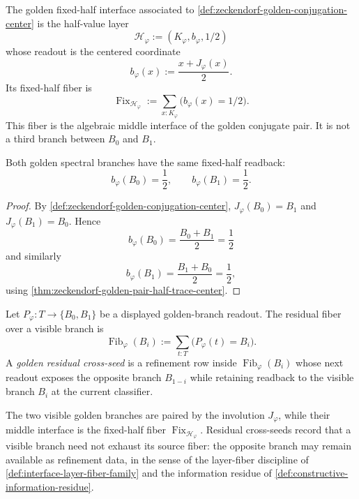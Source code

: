 \begin{definition}
\label{def:zeckendorf-golden-fixed-half-interface}
The golden fixed-half interface associated to
\autoref{def:zeckendorf-golden-conjugation-center} is the half-value
layer
$$
\mathcal H_{\varphi}
:=
(K_{\varphi},b_{\varphi},1/2)
$$
whose readout is the centered coordinate
$$
b_{\varphi}(x):=\frac{x+J_{\varphi}(x)}{2}.
$$
Its fixed-half fiber is
$$
\operatorname{Fix}_{\mathcal H_{\varphi}}
:=
\sum_{x:K_{\varphi}}\bigl(b_{\varphi}(x)=1/2\bigr).
$$
This fiber is the algebraic middle interface of the golden conjugate
pair. It is not a third branch between $B_0$ and $B_1$.
\end{definition}

\begin{theorem}
\label{thm:zeckendorf-golden-branches-read-back-fixed-half}
Both golden spectral branches have the same fixed-half readback:
$$
b_{\varphi}(B_0)=\frac12,
\qquad
b_{\varphi}(B_1)=\frac12.
$$
\end{theorem}

\begin{proof}
By \autoref{def:zeckendorf-golden-conjugation-center},
$J_{\varphi}(B_0)=B_1$ and $J_{\varphi}(B_1)=B_0$. Hence
$$
b_{\varphi}(B_0)
=
\frac{B_0+B_1}{2}
=
\frac12
$$
and similarly
$$
b_{\varphi}(B_1)
=
\frac{B_1+B_0}{2}
=
\frac12,
$$
using \autoref{thm:zeckendorf-golden-pair-half-trace-center}.
\end{proof}

\begin{definition}
\label{def:zeckendorf-golden-residual-cross-seed}
Let $P_{\varphi}:T\to\{B_0,B_1\}$ be a displayed golden-branch readout.
The residual fiber over a visible branch is
$$
\operatorname{Fib}_{\varphi}(B_i)
:=
\sum_{t:T}\bigl(P_{\varphi}(t)=B_i\bigr).
$$
A \emph{golden residual cross-seed} is a refinement row inside
$\operatorname{Fib}_{\varphi}(B_i)$ whose next readout exposes the
opposite branch $B_{1-i}$ while retaining readback to the visible branch
$B_i$ at the current classifier.
\end{definition}

\begin{principle}
\label{prin:zeckendorf-conjugate-fiber-interface}
The two visible golden branches are paired by the involution
$J_{\varphi}$, while their middle interface is the fixed-half fiber
$\operatorname{Fix}_{\mathcal H_{\varphi}}$. Residual cross-seeds record
that a visible branch need not exhaust its source fiber: the opposite
branch may remain available as refinement data, in the sense of the
layer-fiber discipline of \autoref{def:interface-layer-fiber-family} and
the information residue of \autoref{def:constructive-information-residue}.
\end{principle}

